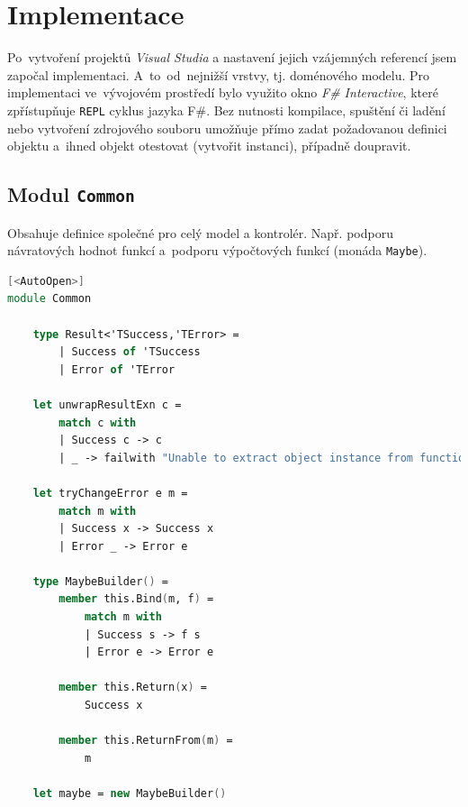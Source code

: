 \documentclass[12pt]{article}
\begin{document}
\section{Implementace}
Po~vytvoření projektů \emph{Visual Studia} a nastavení jejich vzájemných referencí jsem započal implementaci. A~to~od~nejnižší vrstvy, tj. doménového modelu. Pro implementaci ve~vývojovém prostředí bylo využito okno \emph{F\# Interactive}, které zpřístupňuje \texttt{REPL} cyklus jazyka F\#. Bez nutnosti kompilace, spuštění či ladění nebo vytvoření zdrojového souboru umožňuje přímo zadat požadovanou definici objektu a~ihned objekt otestovat (vytvořit instanci), případně doupravit.

\subsection{Modul \texttt{Common}}
Obsahuje definice společné pro celý model a kontrolér. Např. podporu návratových hodnot funkcí a~podporu výpočtových funkcí (monáda \texttt{Maybe}).
\begin{lstlisting}[language=FSharp]
[<AutoOpen>]
module Common

    type Result<'TSuccess,'TError> = 
        | Success of 'TSuccess 
        | Error of 'TError

    let unwrapResultExn c =
        match c with
        | Success c -> c
        | _ -> failwith "Unable to extract object instance from function result, because called function has failed."

    let tryChangeError e m =
        match m with
        | Success x -> Success x
        | Error _ -> Error e

    type MaybeBuilder() =
        member this.Bind(m, f) = 
            match m with
            | Success s -> f s
            | Error e -> Error e

        member this.Return(x) = 
            Success x

        member this.ReturnFrom(m) =
            m

    let maybe = new MaybeBuilder()
\end{lstlisting}
\end{document}
